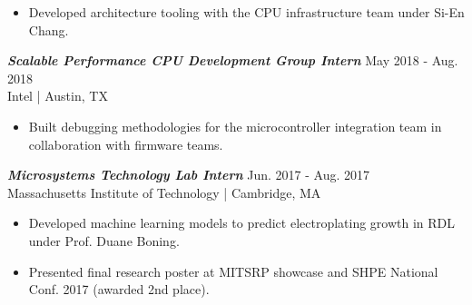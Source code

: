 \documentclass[letter]{res}
\begin{document}
\begin{resume}
 \begin{itemize}
 \item Developed architecture tooling with the CPU infrastructure team under Si-En Chang.
 \end{itemize}

\vspace{-2.5mm}

{\sl \textbf{Scalable Performance CPU Development Group Intern}} \hfill May 2018 - Aug. 2018\\
Intel | Austin, TX \newline

 \vspace{-4mm}

 \begin{itemize}
 \item Built debugging methodologies for the microcontroller integration
   team in collaboration with firmware teams.
 \end{itemize}

\vspace{-2.5mm}

{\sl \textbf{Microsystems Technology Lab Intern}} \hfill Jun. 2017 - Aug. 2017\\
Massachusetts Institute of Technology | Cambridge, MA \newline

 \vspace{-4mm}

 \begin{itemize}
 \item Developed machine learning models to predict electroplating growth in RDL under Prof. Duane Boning.
 \item Presented final research poster at MITSRP showcase and SHPE National Conf. 2017 (awarded 2nd place).
 \end{itemize}

\vspace{-2.5mm}

%
%
%


\end{resume}
\end{document}

